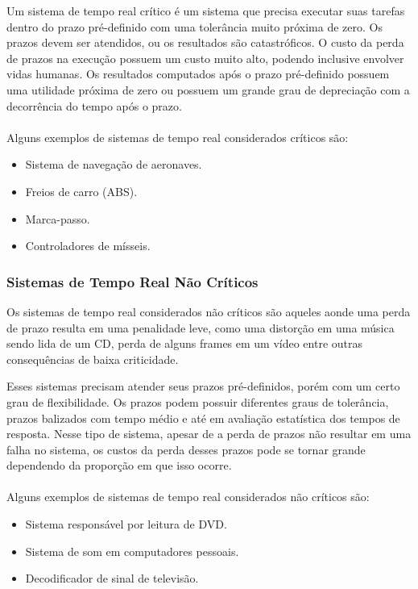 Um sistema de tempo real crítico é um sistema que precisa executar suas tarefas dentro do prazo
pré-definido com uma tolerância muito próxima de zero. Os prazos devem ser atendidos, ou os resultados
são catastróficos. O custo da perda de prazos na execução possuem um custo muito alto, podendo inclusive
envolver vidas humanas. Os resultados computados após o prazo pré-definido possuem uma utilidade próxima
de zero ou possuem um grande grau de depreciação com a decorrência do tempo após o prazo.~\cite{Li:2003:RCE:829584} \\\\
Alguns exemplos de sistemas de tempo real considerados críticos são:
\begin{itemize}
\item Sistema de navegação de aeronaves.
\item Freios de carro (ABS).
\item Marca-passo.
\item Controladores de mísseis.
\end{itemize}

\subsubsection{Sistemas de Tempo Real Não Críticos}
Os sistemas de tempo real considerados não críticos são aqueles aonde uma perda de prazo
resulta em uma penalidade leve, como uma distorção em uma música sendo lida de um CD, perda
de alguns frames em um vídeo entre outras consequências de baixa criticidade.

Esses sistemas precisam atender seus prazos pré-definidos, porém com um certo grau de flexibilidade.
Os prazos podem possuir diferentes graus de tolerância, prazos balizados com tempo médio e até em avaliação
estatística dos tempos de resposta. Nesse tipo de sistema, apesar de a perda de prazos não resultar em uma
falha no sistema, os custos da perda desses prazos pode se tornar grande dependendo da proporção em que isso
ocorre.~\cite{Li:2003:RCE:829584} \\\\
Alguns exemplos de sistemas de tempo real considerados não críticos são:
\begin{itemize}
\item Sistema responsável por leitura de DVD.
\item Sistema de som em computadores pessoais.
\item Decodificador de sinal de televisão.
\end{itemize}

